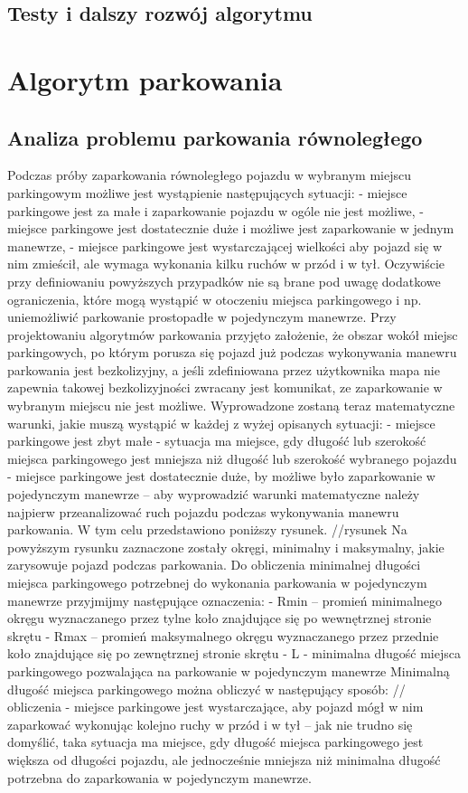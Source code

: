 \documentclass[a4paper,11pt,twoside]{report}
\theoremstyle{definition}
\begin{document}
\subsection{Testy i dalszy rozwój algorytmu}

\section{Algorytm parkowania}

\subsection{Analiza problemu parkowania równoległego}

Podczas próby zaparkowania równoległego pojazdu w wybranym miejscu parkingowym możliwe jest wystąpienie następujących sytuacji:
- miejsce parkingowe jest za małe i zaparkowanie pojazdu w ogóle nie jest możliwe,
- miejsce parkingowe jest dostatecznie duże i możliwe jest zaparkowanie w jednym manewrze,
- miejsce parkingowe jest wystarczającej wielkości aby pojazd się w nim zmieścił, ale wymaga wykonania kilku ruchów w przód i w tył.
Oczywiście przy definiowaniu powyższych przypadków nie są brane pod uwagę dodatkowe ograniczenia, które mogą wystąpić w otoczeniu miejsca parkingowego i np. uniemożliwić parkowanie prostopadłe w pojedynczym manewrze. Przy projektowaniu algorytmów parkowania przyjęto założenie, że obszar wokół miejsc parkingowych, po którym porusza się pojazd już podczas wykonywania manewru parkowania jest bezkolizyjny, a jeśli zdefiniowana przez użytkownika mapa nie zapewnia takowej bezkolizyjności zwracany jest komunikat, ze zaparkowanie w wybranym miejscu nie jest możliwe. 
Wyprowadzone zostaną teraz matematyczne warunki, jakie muszą wystąpić w każdej z wyżej opisanych sytuacji:
- miejsce parkingowe jest zbyt małe - sytuacja ma miejsce, gdy długość lub szerokość miejsca parkingowego jest mniejsza niż długość lub szerokość wybranego pojazdu
- miejsce parkingowe jest dostatecznie duże, by możliwe było zaparkowanie w pojedynczym manewrze – aby wyprowadzić warunki matematyczne należy najpierw przeanalizować ruch pojazdu podczas wykonywania manewru parkowania. W tym celu przedstawiono poniższy rysunek.
//rysunek
Na powyższym rysunku zaznaczone zostały okręgi, minimalny i maksymalny, jakie zarysowuje pojazd podczas parkowania. Do obliczenia minimalnej długości miejsca parkingowego potrzebnej do wykonania parkowania w pojedynczym manewrze przyjmijmy następujące oznaczenia:
- Rmin – promień minimalnego okręgu wyznaczanego przez tylne koło znajdujące się po wewnętrznej stronie skrętu
- Rmax – promień maksymalnego okręgu wyznaczanego przez przednie koło znajdujące się po zewnętrznej stronie skrętu
- L - minimalna długość miejsca parkingowego pozwalająca na parkowanie w pojedynczym manewrze
Minimalną długość miejsca parkingowego można obliczyć w następujący sposób:
// obliczenia
- miejsce parkingowe jest wystarczające, aby pojazd mógł w nim zaparkować wykonując kolejno ruchy w przód i w tył – jak nie trudno się domyślić, taka sytuacja ma miejsce, gdy długość miejsca parkingowego jest większa od długości pojazdu, ale jednocześnie mniejsza niż minimalna długość potrzebna do zaparkowania w pojedynczym manewrze.
\end{document}
